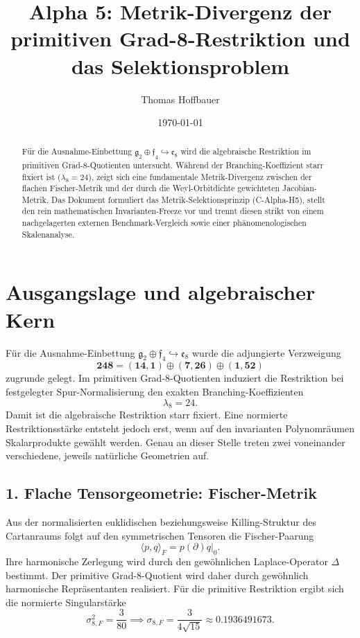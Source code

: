 \documentclass[11pt,a4paper]{article}
\title{\textbf{Alpha 5: Metrik-Divergenz der primitiven Grad-8-Restriktion und das Selektionsproblem}}
\author{Thomas Hoffbauer}
\date{\today}
\begin{document}
\maketitle

\begin{abstract}
Für die Ausnahme-Einbettung $\mathfrak{g}_2 \oplus \mathfrak{f}_4 \hookrightarrow \mathfrak{e}_8$ wird die algebraische Restriktion im primitiven Grad-8-Quotienten untersucht. Während der Branching-Koeffizient starr fixiert ist ($\lambda_8 = 24$), zeigt sich eine fundamentale Metrik-Divergenz zwischen der flachen Fischer-Metrik und der durch die Weyl-Orbitdichte gewichteten Jacobian-Metrik. Das Dokument formuliert das Metrik-Selektionsprinzip (C-Alpha-H5), stellt den rein mathematischen Invarianten-Freeze vor und trennt diesen strikt von einem nachgelagerten externen Benchmark-Vergleich sowie einer phänomenologischen Skalenanalyse.
\end{abstract}

\section{Ausgangslage und algebraischer Kern}

Für die Ausnahme-Einbettung $\mathfrak{g}_2 \oplus \mathfrak{f}_4 \hookrightarrow \mathfrak{e}_8$ wurde die adjungierte Verzweigung
$$\mathbf{248} = (\mathbf{14},\mathbf{1}) \oplus (\mathbf{7},\mathbf{26}) \oplus (\mathbf{1},\mathbf{52})$$
zugrunde gelegt. Im primitiven Grad-8-Quotienten induziert die Restriktion bei festgelegter Spur-Normalisierung den exakten Branching-Koeffizienten
$$\lambda_8 = 24.$$
Damit ist die algebraische Restriktion starr fixiert. Eine normierte Restriktionsstärke entsteht jedoch erst, wenn auf den invarianten Polynomräumen Skalarprodukte gewählt werden. Genau an dieser Stelle treten zwei voneinander verschiedene, jeweils natürliche Geometrien auf.

\subsection{1. Flache Tensorgeometrie: Fischer-Metrik}
Aus der normalisierten euklidischen beziehungsweise Killing-Struktur des Cartanraums folgt auf den symmetrischen Tensoren die Fischer-Paarung
$$\langle p, q \rangle_F = p(\partial)q\big|_0.$$
Ihre harmonische Zerlegung wird durch den gewöhnlichen Laplace-Operator $\Delta$ bestimmt. Der primitive Grad-8-Quotient wird daher durch gewöhnlich harmonische Repräsentanten realisiert. Für die primitive Restriktion ergibt sich die normierte Singularstärke
$$\sigma_{8,F}^2 = \frac{3}{80} \implies \sigma_{8,F} = \frac{3}{4\sqrt{15}} \approx 0.1936491673.$$
\end{document}
